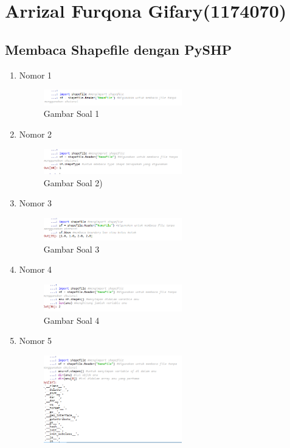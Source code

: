 \section{Arrizal Furqona Gifary(1174070)}
\subsection{Membaca Shapefile dengan PySHP}
\begin{enumerate}
	\item Nomor 1
	
	\begin{figure}[H]
		\includegraphics[width=6cm]{figures/Tugas3/1174070/soal1.png}
		\centering
		\caption{Gambar Soal 1}
	\end{figure}
	\item Nomor 2
	
	\begin{figure}[H]
		\includegraphics[width=6cm]{figures/Tugas3/1174070/soal2.png}
		\centering
		\caption{Gambar Soal 2)}
	\end{figure}
	\item Nomor 3
	
	\begin{figure}[H]
		\includegraphics[width=6cm]{figures/Tugas3/1174070/soal3.png}
		\centering
		\caption{Gambar Soal 3}
	\end{figure}
	\item Nomor 4
	
	\begin{figure}[H]
		\includegraphics[width=6cm]{figures/Tugas3/1174070/soal4.png}
		\centering
		\caption{Gambar Soal 4}
	\end{figure}
	\item Nomor 5
	
	\begin{figure}[H]
		\includegraphics[width=6cm]{figures/Tugas3/1174070/soal5.png}

\end{figure}
\end{enumerate}
